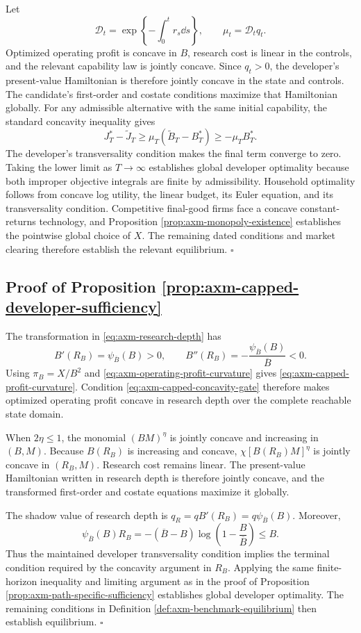 Let
\[
 \mathcal D_t=\exp\left\{-\int_0^t r_s\dd s\right\},
 \qquad \mu_t=\mathcal D_tq_t.
\]
Optimized operating profit is concave in \(B\), research cost is linear in
the controls, and the relevant capability law is jointly concave. Since
\(q_t>0\), the developer's present-value Hamiltonian is therefore jointly
concave in the state and controls. The candidate's first-order and costate
conditions maximize that Hamiltonian globally. For any admissible alternative
with the same initial capability, the standard concavity inequality gives
\[
 J_T^*-\widetilde J_T
 \geq \mu_T(\widetilde B_T-B_T^*)
 \geq-\mu_TB_T^*.
\]
The developer's transversality condition makes the final term converge to
zero. Taking the lower limit as \(T\to\infty\) establishes global developer
optimality because both improper objective integrals are finite by
admissibility. Household optimality follows from concave log utility, the
linear budget, its Euler equation, and its transversality condition.
Competitive final-good firms face a concave constant-returns technology, and
Proposition \ref{prop:axm-monopoly-existence} establishes the pointwise global
choice of \(X\). The remaining dated conditions and market clearing therefore
establish the relevant equilibrium. \(\square\)

\subsection{Proof of Proposition \ref{prop:axm-capped-developer-sufficiency}}

The transformation in \eqref{eq:axm-research-depth} has
\[
 B'(R_B)=\psi_{\overline B}(B)>0,
 \qquad
 B''(R_B)=-\frac{\psi_{\overline B}(B)}{\overline B}<0.
\]
Using \(\pi_B=X/B^2\) and
\eqref{eq:axm-operating-profit-curvature} gives
\eqref{eq:axm-capped-profit-curvature}. Condition
\eqref{eq:axm-capped-concavity-gate} therefore makes optimized operating profit
concave in research depth over the complete reachable state domain.

When \(2\eta\leq1\), the monomial \((BM)^\eta\) is jointly concave and
increasing in \((B,M)\). Because \(B(R_B)\) is increasing and concave,
\(\chi[B(R_B)M]^\eta\) is jointly concave in \((R_B,M)\). Research cost remains
linear. The present-value Hamiltonian written in research depth is therefore
jointly concave, and the transformed first-order and costate equations maximize
it globally.

The shadow value of research depth is
\(q_R=qB'(R_B)=q\psi_{\overline B}(B)\). Moreover,
\[
 \psi_{\overline B}(B)R_B
 =-(\overline B-B)\log\left(1-\frac{B}{\overline B}\right)
 \leq B.
\]
Thus the maintained developer transversality condition implies the terminal
condition required by the concavity argument in \(R_B\). Applying the same
finite-horizon inequality and limiting argument as in the proof of Proposition
\ref{prop:axm-path-specific-sufficiency} establishes global developer
optimality. The remaining conditions in Definition
\ref{def:axm-benchmark-equilibrium} then establish equilibrium. \(\square\)

